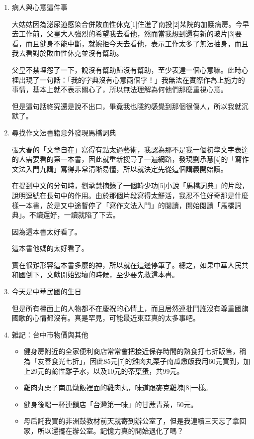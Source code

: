 \documentclass[a5paper, 12pt
]{book}
\providecommand{\tightlist}{%
  \setlength{\itemsep}{0pt}\setlength{\parskip}{0pt}}
\begin{document}
\begin{enumerate}
\def\labelenumi{\arabic{enumi}.}
\item
  病人與心意這件事

  大姑姑因為泌尿道感染合併敗血性休克{[}1{]}住進了南投{[}2{]}某院的加護病房。今早去工作前，父皇大人強烈的希望我去看他，然而當我想到還有新的玻片{[}3{]}要看，而且健身不能中斷，就婉拒今天去看他，表示工作太多了無法抽身，而且我去看對於敗血性休克並沒有幫助。

  父皇不禁埋怨了一下，說沒有幫助歸沒有幫助，至少表達一個心意嘛。此時心裡出現了一句話：「我的字典沒有心意兩個字！」我無法在實際作為上施力的事情，基本上就不表示關心了，所以無法理解為何他們那麼重視心意。

  但是這句話終究還是說不出口，畢竟我也隱約感覺到那個很傷人，所以我就沉默了。
\item
  尋找作文法書籍意外發現馬橋詞典

  張大春的「文章自在」寫得有點太過藝術，我認為那不是我一個初學文字表達的人需要看的第一本書，因此就重新搜尋了一遍網路，發現劉承慧{[}4{]}的「寫作文法入門九講」寫得非常清晰易懂，所以就決定先從這個講義開始讀。

  在提到中文的分句時，劉承慧摘錄了一個韓少功{[}5{]}小說「馬橋詞典」的片段，說明逗號在長句中的作用。由於那個片段寫得太鮮活，我忍不住好奇那是什麼樣一本書，於是又中途暫停了「寫作文法入門」的閱讀，開始閱讀「馬橋詞典」。不讀還好，一讀就陷了下去。

  因為這本書太好看了。

  這本書他媽的太好看了。

  實在很難形容這本書多麼的神，所以就在這邊停筆了。總之，如果中華人民共和國倒下，文獻開始毀壞的時候，至少要先救這本書。
\item
  今天是中華民國的生日

  但是所有檯面上的人物都不在慶祝的心情上，而且居然連批鬥誰沒有尊重國旗國歌的心情都沒有。真是罕見，可能最近東亞真的太多事吧。
\item
  雜記：台中市物價與其他

  \begin{itemize}
  \tightlist
  \item
    健身房附近的全家便利商店常常會把接近保存時間的熟食打七折販售，稱為「友善食光七折」，因此85元{[}7{]}的雞肉丸栗子南瓜燉飯我用60元買到，加上29元的鹼性離子水，以及10元的茶葉蛋，共99元。
  \item
    雞肉丸栗子南瓜燉飯裡面的雞肉丸，味道跟麥克雞塊{[}8{]}一樣。
  \item
    健身後喝一杯連鎖店「台灣第一味」的甘蔗青茶，50元。
  \item
    母后託我買的非洲鼓教材前天就寄到辦公室了，但是我連續三天忘了拿回家，所以還擺在辦公室。記憶力真的開始退化了嗎？
  \end{itemize}
\end{enumerate}
\end{document}

